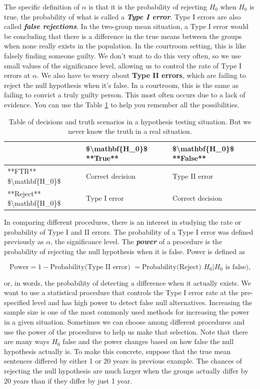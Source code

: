 \documentclass[]{book}
\begin{document}
The specific definition of \(\alpha\) is that it is the probability of
rejecting \(H_0\) when \(H_0\) is true, the probability of what is
called a \textbf{\emph{Type I error}}. Type I errors are also called
\textbf{\emph{false rejections}}. In the two-group mean situation, a
Type I error would be concluding that there is a difference in the true
means between the groups when none really exists in the population. In
the courtroom setting, this is like falsely finding someone guilty. We
don't want to do this very often, so we use small values of the
significance level, allowing us to control the rate of Type I errors at
\(\alpha\). We also have to worry about \textbf{Type II errors}, which
are failing to reject the null hypothesis when it's false. In a
courtroom, this is the same as failing to convict a truly guilty person.
This most often occurs due to a lack of evidence. You can use the Table
\ref{tab:Table2-2} to help you remember all the possibilities.




\begin{table}

\caption{\label{tab:Table2-2}Table of decisions and truth scenarios in a hypothesis
testing situation. But we never know the truth in a real situation.}
\centering
\begin{tabular}[t]{l|l|l}
\hline
 & \$\textbackslash{}mathbf\{H\_0\}\$ **True** & \$\textbackslash{}mathbf\{H\_0\}\$ **False**\\
\hline
**FTR** \$\textbackslash{}mathbf\{H\_0\}\$ & Correct decision & Type II error\\
\hline
**Reject** \$\textbackslash{}mathbf\{H\_0\}\$ & Type I error & Correct decision\\
\hline
\end{tabular}
\end{table}

In comparing different procedures, there is an interest in studying the
rate or probability of Type I and II errors. The probability of a Type I
error was defined previously as \(\alpha\), the significance level. The
\textbf{\emph{power}} of a procedure is the probability of rejecting the
null hypothesis when it is false. Power is defined as

\[\text{Power} = 1 - \text{Probability(Type II error) } = 
\text{Probability(Reject) } H_0 | H_0 \text{ is false),}\]

or, in words, the probability of detecting a difference when it actually
exists. We want to use a statistical procedure that controls the Type I
error rate at the pre-specified level and has high power to detect false
null alternatives. Increasing the sample size is one of the most
commonly used methods for increasing the power in a given situation.
Sometimes we can choose among different procedures and use the power of
the procedures to help us make that selection. Note that there are many
ways \(H_0\) false and the power changes based on how false the null
hypothesis actually is. To make this concrete, suppose that the true
mean sentences differed by either 1 or 20 years in previous example. The
chances of rejecting the null hypothesis are much larger when the groups
actually differ by 20 years than if they differ by just 1 year.
\end{document}
